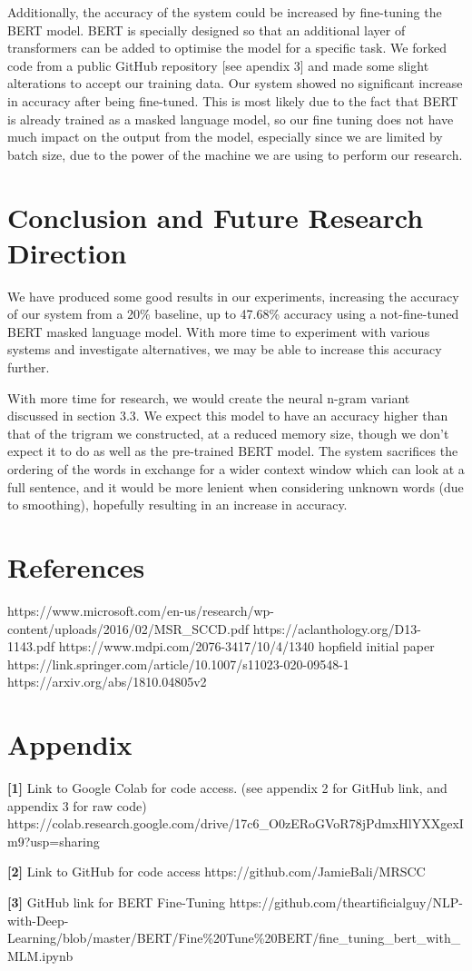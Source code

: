 \documentclass{article}
\begin{document}
Additionally, the accuracy of the system could be increased by fine-tuning the BERT model. BERT is specially designed so that an additional layer of transformers can be added to optimise the model for a specific task. We forked code from a public GitHub repository [see apendix 3] and made some slight alterations to accept our training data. Our system showed no significant increase in accuracy after being fine-tuned. This is most likely due to the fact that BERT is already trained as a masked language model, so our fine tuning does not have much impact on the output from the model, especially since we are limited by batch size, due to the power of the machine we are using to perform our research.

\section{Conclusion and Future Research Direction}
We have produced some good results in our experiments, increasing the accuracy of our system from a 20\% baseline, up to 47.68\% accuracy using a not-fine-tuned BERT masked language model. With more time to experiment with various systems and investigate alternatives, we may be able to increase this accuracy further.

With more time for research, we would create the neural n-gram variant discussed in section 3.3. We expect this model to have an accuracy higher than that of the trigram we constructed, at a reduced memory size, though we don't expect it to do as well as the pre-trained BERT model. The system sacrifices the ordering of the words in exchange for a wider context window which can look at a full sentence, and it would be more lenient when considering unknown words (due to smoothing), hopefully resulting in an increase in accuracy.

\newpage

\section{References}
https://www.microsoft.com/en-us/research/wp-content/uploads/2016/02/MSR\_SCCD.pdf
https://aclanthology.org/D13-1143.pdf
https://www.mdpi.com/2076-3417/10/4/1340
hopfield initial paper
https://link.springer.com/article/10.1007/s11023-020-09548-1
https://arxiv.org/abs/1810.04805v2

\section{Appendix}
\textbf{[1]} Link to Google Colab for code access. (see appendix 2 for GitHub link, and appendix 3 for raw code) https://colab.research.google.com/drive/17c6\_O0zERoGVoR78jPdmxHlYXXgexIm9?usp=sharing

\textbf{[2]} Link to GitHub for code access 
https://github.com/JamieBali/MRSCC

\textbf{[3]} GitHub link for BERT Fine-Tuning 
https://github.com/theartificialguy/NLP-with-Deep-Learning/blob/master/BERT/Fine\%20Tune\%20BERT/fine\_tuning\_bert\_with\_MLM.ipynb
\end{document}
